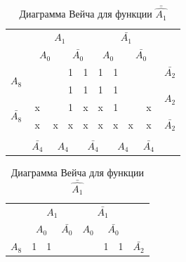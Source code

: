 \documentclass[a4paper,14pt]{article}
\begin{document}
\begin{table}[H]
	\begin{minipage}{.5\linewidth}
		\caption{Диаграмма Вейча для функции $\hat{A_1}$}
		\centering
		\begin{tabular}{cccccccccc}
			& \multicolumn{4}{c}{$A_1$} & \multicolumn{4}{c}{$\bar{A_1}$} &  \\
			& \multicolumn{2}{c}{$A_0$} & \multicolumn{2}{c}{$\bar{A_0}$} & \multicolumn{2}{c}{$A_0$} & \multicolumn{2}{c}{$\bar{A_0}$} &  \\ \cline{2-9}
			\multicolumn{1}{c|}{\multirow{2}{*}{$A_8$}} & \multicolumn{1}{c|}{} & \multicolumn{1}{c|}{} & \multicolumn{1}{c|}{1} & \multicolumn{1}{c|}{1} & \multicolumn{1}{c|}{1} & \multicolumn{1}{c|}{1} & \multicolumn{1}{c|}{} & \multicolumn{1}{c|}{} & $\bar{A_2}$ \\ \cline{2-9}
			\multicolumn{1}{c|}{} & \multicolumn{1}{c|}{} & \multicolumn{1}{c|}{} & \multicolumn{1}{c|}{1} & \multicolumn{1}{c|}{1} & \multicolumn{1}{c|}{1} & \multicolumn{1}{c|}{1} & \multicolumn{1}{c|}{} & \multicolumn{1}{c|}{} & \multirow{2}{*}{$A_2$} \\ \cline{2-9}
			\multicolumn{1}{c|}{\multirow{2}{*}{$\bar{A_8}$}} & \multicolumn{1}{c|}{x} & \multicolumn{1}{c|}{} & \multicolumn{1}{c|}{1} & \multicolumn{1}{c|}{x} & \multicolumn{1}{c|}{x} & \multicolumn{1}{c|}{1} & \multicolumn{1}{c|}{} & \multicolumn{1}{c|}{x} &  \\ \cline{2-9}
			\multicolumn{1}{c|}{} & \multicolumn{1}{c|}{x} & \multicolumn{1}{c|}{x} & \multicolumn{1}{c|}{x} & \multicolumn{1}{c|}{x} & \multicolumn{1}{c|}{x} & \multicolumn{1}{c|}{x} & \multicolumn{1}{c|}{x} & \multicolumn{1}{c|}{x} & $\bar{A_2}$ \\ \cline{2-9}
			\\
			& $\bar{A_4}$ & \multicolumn{2}{c}{$A_4$} & \multicolumn{2}{c}{$\bar{A_4}$} & \multicolumn{2}{c}{$A_4$} & $\bar{A_4}$ & 
		\end{tabular}
	\end{minipage}%
	\begin{minipage}{.5\linewidth}
		\centering
		\caption{Диаграмма Вейча для функции $\bar{\hat{A_1}}$}
		\begin{tabular}{cccccccccc}
			& \multicolumn{4}{c}{$A_1$} & \multicolumn{4}{c}{$\bar{A_1}$} &  \\
			& \multicolumn{2}{c}{$A_0$} & \multicolumn{2}{c}{$\bar{A_0}$} & \multicolumn{2}{c}{$A_0$} & \multicolumn{2}{c}{$\bar{A_0}$} &  \\ \cline{2-9}
			\multicolumn{1}{c|}{\multirow{2}{*}{$A_8$}} & \multicolumn{1}{c|}{1} & \multicolumn{1}{c|}{1} & \multicolumn{1}{c|}{} & \multicolumn{1}{c|}{} & \multicolumn{1}{c|}{} & \multicolumn{1}{c|}{} & \multicolumn{1}{c|}{1} & \multicolumn{1}{c|}{1} & $\bar{A_2}$ \\ \cline{2-9}

\end{tabular}
\end{minipage}
\end{table}
\end{document}
